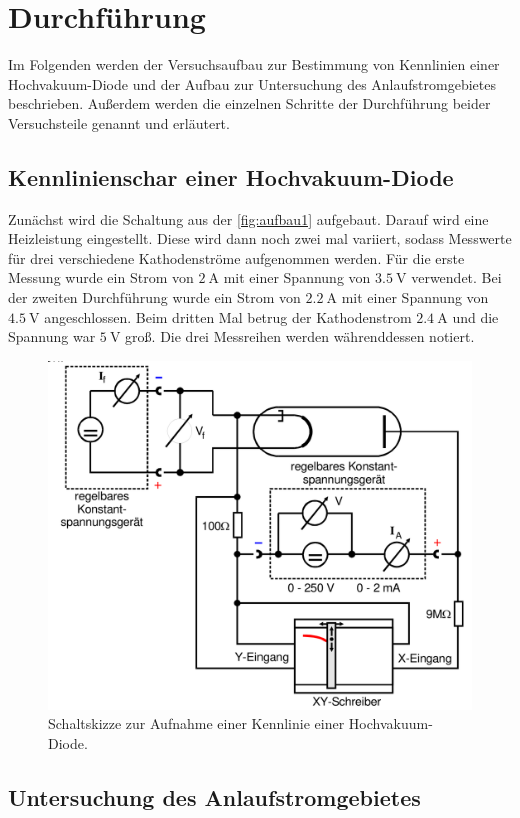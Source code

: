 \section{Durchführung}
\label{sec:durchführung}

Im Folgenden werden der Versuchsaufbau zur Bestimmung von Kennlinien einer Hochvakuum-Diode und der Aufbau zur Untersuchung 
des Anlaufstromgebietes beschrieben. Außerdem werden die einzelnen Schritte der Durchführung beider Versuchsteile genannt und erläutert.

\subsection{Kennlinienschar einer Hochvakuum-Diode}
\label{sec:Kennlinieschar}
 
Zunächst wird die Schaltung aus der \autoref{fig:aufbau1} aufgebaut. Darauf wird eine Heizleistung eingestellt.
Diese wird dann noch zwei mal variiert, sodass Messwerte für drei verschiedene Kathodenströme aufgenommen werden.
Für die erste Messung wurde ein Strom von $\SI{2}{\ampere}$ mit einer Spannung von $\SI{3.5}{\volt}$ verwendet.
Bei der zweiten Durchführung wurde ein Strom von $\SI{2.2}{\ampere}$ mit einer Spannung von $\SI{4.5}{\volt}$ angeschlossen.
Beim dritten Mal betrug der Kathodenstrom $\SI{2.4}{\ampere}$ und die Spannung war $\SI{5}{\volt}$ groß.
Die drei Messreihen werden währenddessen notiert.

\begin{figure}[H]
    \centering
    \includegraphics[width=0.5\linewidth]{content/grafik/aufbau1.png}
    \caption{Schaltskizze zur Aufnahme einer Kennlinie einer Hochvakuum-Diode.\cite{elektron}}
    \label{fig:aufbau1}
\end{figure}

\subsection{Untersuchung des Anlaufstromgebietes}
\label{sec:Untersuchung des Anlaufstromgebietes}

